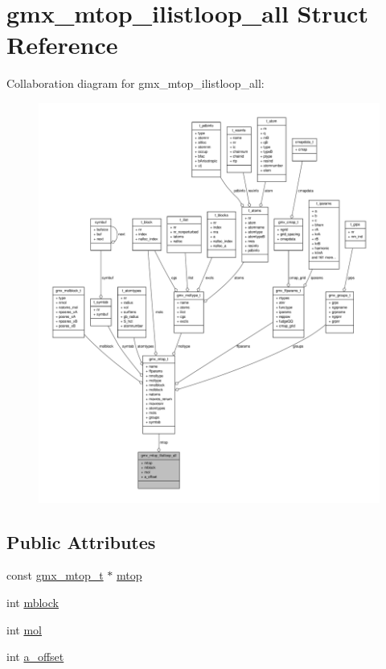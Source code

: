 \hypertarget{structgmx__mtop__ilistloop__all}{\section{gmx\-\_\-mtop\-\_\-ilistloop\-\_\-all \-Struct \-Reference}
\label{structgmx__mtop__ilistloop__all}
}


\-Collaboration diagram for gmx\-\_\-mtop\-\_\-ilistloop\-\_\-all\-:
\nopagebreak
\begin{figure}[H]
\begin{center}
\leavevmode
\includegraphics[width=350pt]{structgmx__mtop__ilistloop__all__coll__graph}
\end{center}
\end{figure}
\subsection*{\-Public \-Attributes}
\begin{DoxyCompactItemize}
\item 
const \hyperlink{structgmx__mtop__t}{gmx\-\_\-mtop\-\_\-t} $\ast$ \hyperlink{structgmx__mtop__ilistloop__all_a0a67ca5f891df6d6793ce677ecfd9fb0}{mtop}
\item 
int \hyperlink{structgmx__mtop__ilistloop__all_a1305e9a3f945ccce494ea1f67c02dce1}{mblock}
\item 
int \hyperlink{structgmx__mtop__ilistloop__all_a93e0b9c52204b5751e9e675c573ddb45}{mol}
\item 
int \hyperlink{structgmx__mtop__ilistloop__all_ac8f5d9ba5dfb95706687377ec575823c}{a\-\_\-offset}
\end{DoxyCompactItemize}



